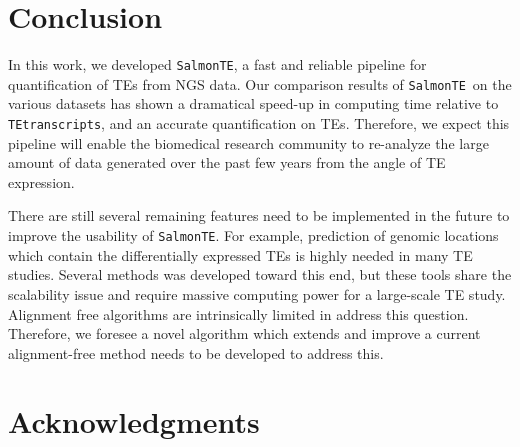 \documentclass{ws-procs11x85}
\newcommand{\TEtranscripts}{\texttt{TEtranscripts}}
\newcommand{\SalmonTE}{\texttt{SalmonTE}}
\begin{document}
\section{Conclusion}


In this work, we  developed \SalmonTE, a fast and reliable pipeline for quantification of TEs from 
NGS data.
Our comparison results of \SalmonTE~on the various datasets has shown a dramatical speed-up in computing time relative to \TEtranscripts, 
and
an accurate quantification on TEs. 
Therefore, we expect this pipeline will enable the biomedical research community to re-analyze the large amount of data generated over the past few years from the angle of TE expression. 

There are still several remaining features need to be implemented in the future to improve the usability of \SalmonTE. 
For example, prediction of genomic locations which 
contain the differentially expressed TEs is highly needed in many TE studies. Several methods was developed toward this end\cite{de2017identifying,criscione2014transcriptional}, but these tools share the scalability issue and require
massive computing power for a large-scale TE study. 
Alignment free algorithms are intrinsically limited in address this 
question. 
Therefore, we foresee a novel algorithm which extends and improve a current alignment-free method needs to be developed to address this.

\section*{Acknowledgments}



\end{document}
